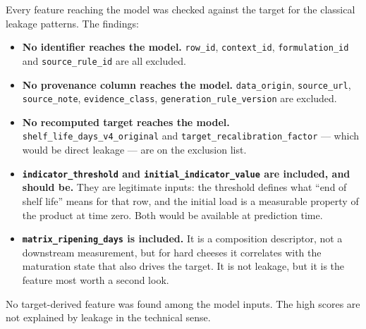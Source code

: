 Every feature reaching the model was checked against the target for the
classical leakage patterns. The findings:

\begin{itemize}[leftmargin=1.3em, itemsep=2pt]
\item \textbf{No identifier reaches the model.} \texttt{row\_id},
  \texttt{context\_id}, \texttt{formulation\_id} and
  \texttt{source\_rule\_id} are all excluded.
\item \textbf{No provenance column reaches the model.}
  \texttt{data\_origin}, \texttt{source\_url}, \texttt{source\_note},
  \texttt{evidence\_class}, \texttt{generation\_rule\_version} are
  excluded.
\item \textbf{No recomputed target reaches the model.}
  \texttt{shelf\_life\_days\_v4\_original} and
  \texttt{target\_recalibration\_factor} --- which would be direct
  leakage --- are on the exclusion list.
\item \textbf{\texttt{indicator\_threshold} and
  \texttt{initial\_indicator\_value} are included, and should be.} They are
  legitimate inputs: the threshold defines what ``end of shelf life'' means
  for that row, and the initial load is a measurable property of the
  product at time zero. Both would be available at prediction time.
\item \textbf{\texttt{matrix\_ripening\_days} is included.} It is a
  composition descriptor, not a downstream measurement, but for hard
  cheeses it correlates with the maturation state that also drives the
  target. It is not leakage, but it is the feature most worth a second
  look.
\end{itemize}

No target-derived feature was found among the model inputs. The high scores
are not explained by leakage in the technical sense.
